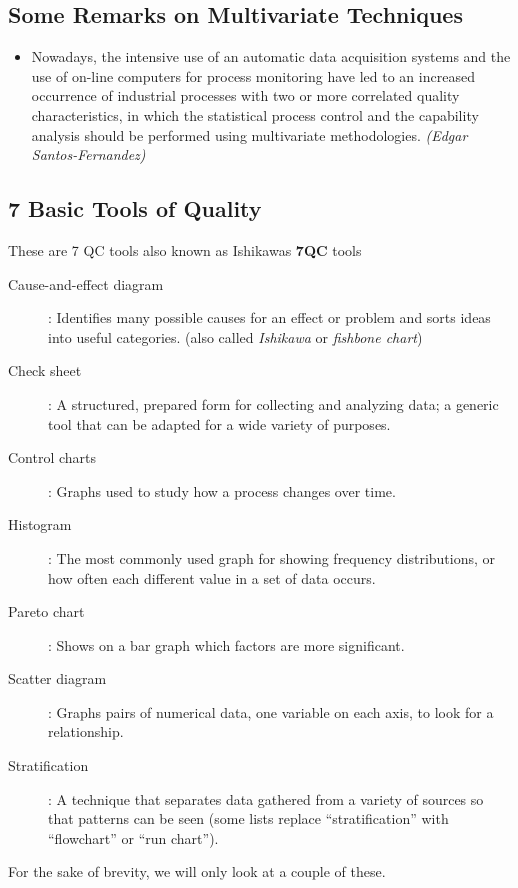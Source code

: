 \documentclass[]{article}
\begin{document}
\subsection{Some Remarks on Multivariate Techniques}
{
\large

\begin{itemize}
\item Nowadays, the intensive use of an automatic data acquisition systems and the use of
on-line computers for process monitoring have led to an increased occurrence of
industrial processes with two or more correlated quality characteristics, in which
the statistical process control and the capability analysis should be performed using
multivariate methodologies. \textit{(Edgar Santos-Fernandez)}
\end{itemize}
}


\newpage
\subsection{7 Basic Tools of Quality }
{\large
These are 7 QC tools also known as Ishikawas \textbf{7QC} tools
\begin{description}
\item[Cause-and-effect diagram]: Identifies many possible causes for an effect or problem and sorts ideas into useful categories.
(also called \textit{Ishikawa} or\textit{ fishbone chart})

\item[Check sheet]: A structured, prepared form for collecting and analyzing data; a generic tool that can be adapted for a wide variety of purposes.

\item[Control charts]: Graphs used to study how a process changes over time.

\item[Histogram]: The most commonly used graph for showing frequency distributions, or how often each different value in a set of data occurs.

\item[Pareto chart]: Shows on a bar graph which factors are more significant.

\item[Scatter diagram]: Graphs pairs of numerical data, one variable on each axis, to look for a relationship.

\item[Stratification]: A technique that separates data gathered from a variety of sources so that patterns can be seen (some lists replace “stratification” with “flowchart” or “run chart”).
\end{description}
For the sake of brevity, we will only look at a couple of these.
}
\end{document}
